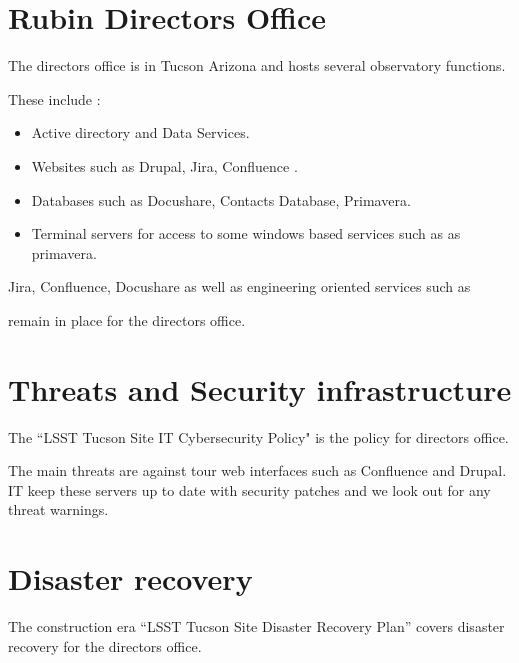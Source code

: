 \section{Rubin Directors Office} \label{sec:rdo}

The directors office is in Tucson Arizona and hosts several observatory functions.

These include :

\begin{itemize}
\item Active directory and Data Services.
\item Websites such as Drupal, Jira, Confluence .
\item Databases such as Docushare, Contacts Database, Primavera.
\item Terminal servers for access to some windows based services such as as primavera.
\end{itemize}
Jira, Confluence, Docushare  as well as  engineering oriented services such as


remain in place for the directors office.


\section{Threats and Security infrastructure}
The “LSST Tucson Site IT Cybersecurity Policy"  is the policy for directors office.

The main threats are against tour web interfaces such as Confluence and Drupal.
IT keep these servers up to date with security patches and we look out for any threat warnings.


\section {Disaster recovery}
The construction era  “LSST Tucson Site Disaster Recovery Plan”  covers disaster recovery for the directors office.
